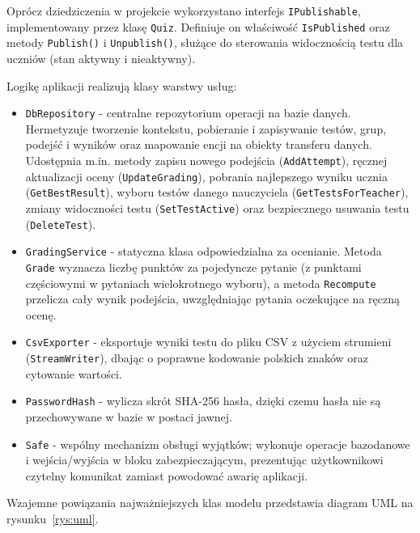 Oprócz dziedziczenia w projekcie wykorzystano interfejs \texttt{IPublishable}, implementowany przez
klasę \texttt{Quiz}. Definiuje on właściwość \texttt{IsPublished} oraz metody \texttt{Publish()}
i \texttt{Unpublish()}, służące do sterowania widocznością testu dla uczniów (stan aktywny
i nieaktywny).

Logikę aplikacji realizują klasy warstwy usług:

\begin{itemize}
  \item \texttt{DbRepository} - centralne repozytorium operacji na bazie danych. Hermetyzuje
        tworzenie kontekstu, pobieranie i zapisywanie testów, grup, podejść i wyników oraz mapowanie
        encji na obiekty transferu danych. Udostępnia m.in. metody zapisu nowego podejścia
        (\texttt{AddAttempt}), ręcznej aktualizacji oceny (\texttt{UpdateGrading}), pobrania
        najlepszego wyniku ucznia (\texttt{GetBestResult}), wyboru testów danego nauczyciela
        (\texttt{GetTestsForTeacher}), zmiany widoczności testu (\texttt{SetTestActive}) oraz
        bezpiecznego usuwania testu (\texttt{DeleteTest}).

  \item \texttt{GradingService} - statyczna klasa odpowiedzialna za ocenianie. Metoda
        \texttt{Grade} wyznacza liczbę punktów za pojedyncze pytanie (z punktami częściowymi
        w pytaniach wielokrotnego wyboru), a metoda \texttt{Recompute} przelicza cały wynik
        podejścia, uwzględniając pytania oczekujące na ręczną ocenę.

  \item \texttt{CsvExporter} - eksportuje wyniki testu do pliku CSV z użyciem strumieni
        (\texttt{StreamWriter}), dbając o poprawne kodowanie polskich znaków oraz cytowanie wartości.

  \item \texttt{PasswordHash} - wylicza skrót SHA-256 hasła, dzięki czemu hasła nie są
        przechowywane w bazie w postaci jawnej.

  \item \texttt{Safe} - wspólny mechanizm obsługi wyjątków; wykonuje operacje bazodanowe
        i wejścia/wyjścia w bloku zabezpieczającym, prezentując użytkownikowi czytelny komunikat
        zamiast powodować awarię aplikacji.
\end{itemize}

Wzajemne powiązania najważniejszych klas modelu przedstawia diagram UML na
rysunku~\ref{rys:uml}.

